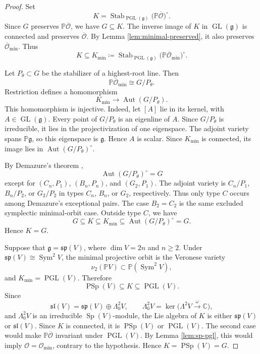 \documentclass[10pt,a4paper]{amsart}
\DeclareMathOperator{\Sym}{Sym}
\newcommand{\C}{\mathbb C}
\begin{document}
\begin{proof}
Set
\[
K=
\operatorname{Stab}_{\operatorname{PGL}(\mathfrak g)}
\bigl(\mathbb P\overline{\mathcal O}\bigr)^\circ.
\]
Since $G$ preserves $\mathbb P\overline{\mathcal O}$, we have
$G\subseteq K$. The inverse image of $K$ in
$\operatorname{GL}(\mathfrak g)$ is connected and preserves
$\overline{\mathcal O}$. By Lemma \ref{lem:minimal-preserved}, it also
preserves $\overline{\mathcal O}_{\min}$. Thus
\[
K\subseteq
K_{\min}\coloneqq
\operatorname{Stab}_{\operatorname{PGL}(\mathfrak g)}
\bigl(\mathbb P\overline{\mathcal O}_{\min}\bigr)^\circ.
\]

Let $P_\theta\subset G$ be the stabilizer of a highest-root line. Then
\[
\mathbb P\overline{\mathcal O}_{\min}\cong G/P_\theta.
\]
Restriction defines a homomorphism
\[
K_{\min}\longrightarrow\operatorname{Aut}(G/P_\theta).
\]
This homomorphism is injective. Indeed, let $[A]$ lie in its kernel,
with $A\in\operatorname{GL}(\mathfrak g)$. Every point of
$G/P_\theta$ is an eigenline of $A$. Since $G/P_\theta$ is
irreducible, it lies in the projectivization of one eigenspace. The
adjoint variety spans $\mathbb P\mathfrak g$, so this eigenspace is
$\mathfrak g$. Hence $A$ is scalar. Since $K_{\min}$ is connected,
its image lies in $\operatorname{Aut}(G/P_\theta)^\circ$.

By Demazure's theorem
\cite[pp.~181--182, Th\'eor\`eme~1]{Demazure},
\[
\operatorname{Aut}(G/P_\theta)^\circ=G
\]
except for $(C_n,P_1)$, $(B_n,P_n)$, and $(G_2,P_1)$. The adjoint
variety is $C_n/P_1$, $B_n/P_2$, or $G_2/P_2$ in types $C_n$, $B_n$,
or $G_2$, respectively. Thus only type $C$ occurs among Demazure's
exceptional pairs. The case $B_2=C_2$ is the same excluded
symplectic minimal-orbit case. Outside type $C$, we have
\[
G\subseteq K\subseteq K_{\min}\subseteq
\operatorname{Aut}(G/P_\theta)^\circ=G.
\]
Hence $K=G$.

Suppose that $\mathfrak g=\mathfrak{sp}(V)$, where $\dim V=2n$ and
$n\geq2$. Under $\mathfrak{sp}(V)\cong\Sym^2V$, the minimal
projective orbit is the Veronese variety
\[
\nu_2(\mathbb P V)\subset\mathbb P(\Sym^2V),
\]
and $K_{\min}=\operatorname{PGL}(V)$. Therefore
\[
\operatorname{PSp}(V)\subseteq K\subseteq\operatorname{PGL}(V).
\]
Since
\[
\mathfrak{sl}(V)=\mathfrak{sp}(V)\oplus\Lambda^2_0V,
\qquad
\Lambda^2_0V=\ker\bigl(\Lambda^2V\xrightarrow{\,\omega\,}\C\bigr),
\]
and $\Lambda^2_0V$ is an irreducible $\operatorname{Sp}(V)$-module,
the Lie algebra of $K$ is either $\mathfrak{sp}(V)$ or
$\mathfrak{sl}(V)$. Since $K$ is connected, it is
$\operatorname{PSp}(V)$ or $\operatorname{PGL}(V)$. The second case
would make $\mathbb P\overline{\mathcal O}$ invariant under
$\operatorname{PGL}(V)$. By Lemma \ref{lem:sp-pgl}, this would imply
$\mathcal O=\mathcal O_{\min}$, contrary to the hypothesis. Hence
$K=\operatorname{PSp}(V)=G$.
\end{proof}
\end{document}
